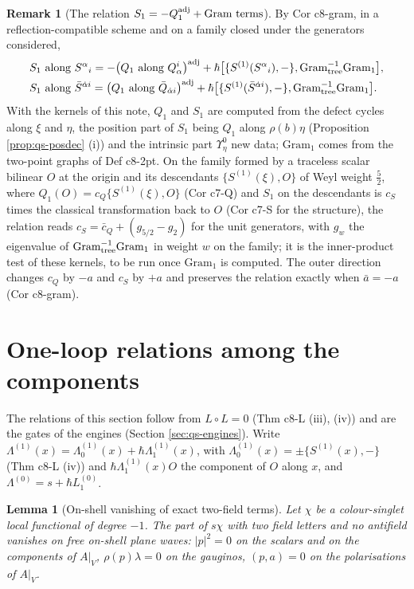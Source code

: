 \documentclass[11pt]{article}
\numberwithin{equation}{section}
\theoremstyle{plain}
\newtheorem{lemma}[theorem]{Lemma}
\theoremstyle{definition}
\newtheorem{remark}[theorem]{Remark}
\newcommand{\AV}{A|_V}
\begin{document}
\begin{remark}[The relation $S_1=-Q_1^{\rm adj}+\text{Gram terms}$]
\label{rem:qs-gram}
By Cor c8-gram, in a reflection-compatible scheme and on a family closed under the generators considered,
\[
\begin{aligned}
&S_1\ \text{along}\ S^\alpha{}_i=-\big(Q_1\ \text{along}\ Q^i_\alpha\big)^{\rm adj}+\hbar\big[\{S^{(1)}(S^\alpha{}_i),-\},\mathrm{Gram}_{\rm tree}^{-1}\mathrm{Gram}_1\big],\\
&S_1\ \text{along}\ \bar S^{\dot\alpha i}=\big(Q_1\ \text{along}\ \bar Q_{\dot\alpha i}\big)^{\rm adj}+\hbar\big[\{S^{(1)}(\bar S^{\dot\alpha i}),-\},\mathrm{Gram}_{\rm tree}^{-1}\mathrm{Gram}_1\big].
\end{aligned}
\]
With the kernels of this note, $Q_1$ and $S_1$ are computed from the defect cycles along $\xi$ and $\eta$, the position part of $S_1$ being $Q_1$ along $\rho(b)\eta$ (Proposition \ref{prop:qs-posdec} (i)) and the intrinsic part $\Upsilon^0_\eta$ new data; $\mathrm{Gram}_1$ comes from the two-point graphs of Def c8-2pt. On the family formed by a traceless scalar bilinear $O$ at the origin and its descendants $\{S^{(1)}(\xi),O\}$ of Weyl weight $\tfrac52$, where $Q_1(O)=c_Q\{S^{(1)}(\xi),O\}$ (Cor c7-Q) and $S_1$ on the descendants is $c_S$ times the classical transformation back to $O$ (Cor c7-S for the structure), the relation reads $c_S=\bar c_Q+(g_{5/2}-g_2)$ for the unit generators, with $g_w$ the eigenvalue of $\mathrm{Gram}_{\rm tree}^{-1}\mathrm{Gram}_1$ in weight $w$ on the family; it is the inner-product test of these kernels, to be run once $\mathrm{Gram}_1$ is computed. The outer direction changes $c_Q$ by $-a$ and $c_S$ by $+a$ and preserves the relation exactly when $\bar a=-a$ (Cor c8-gram).
\end{remark}

\section{One-loop relations among the components}
\label{sec:qs-relations}

The relations of this section follow from $L\circ L=0$ (Thm c8-L (iii), (iv)) and are the gates of the engines (Section \ref{sec:qs-engines}). Write $\Lambda^{(1)}(x)=\Lambda^{(1)}_0(x)+\hbar\Lambda^{(1)}_1(x)$, with $\Lambda^{(1)}_0(x)=\pm\{S^{(1)}(x),-\}$ (Thm c8-L (iv)) and $\hbar\Lambda^{(1)}_1(x)O$ the component of $O$ along $x$, and $\Lambda^{(0)}=s+\hbar L_1^{(0)}$.

\begin{lemma}[On-shell vanishing of exact two-field terms]
\label{lem:qs-onshell}
Let $\chi$ be a colour-singlet local functional of degree $-1$. The part of $s\chi$ with two field letters and no antifield vanishes on free on-shell plane waves: $|p|^2=0$ on the scalars and on the components of $\AV$, $\rho(p)\lambda=0$ on the gauginos, $(p,a)=0$ on the polarisations of $\AV$.
\end{lemma}
\end{document}

